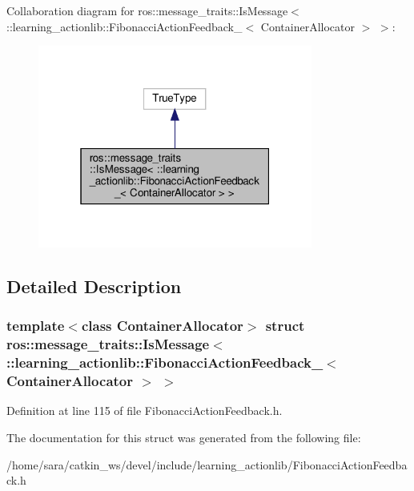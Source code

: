 Collaboration diagram for ros\+:\+:message\+\_\+traits\+:\+:Is\+Message$<$ \+:\+:learning\+\_\+actionlib\+:\+:Fibonacci\+Action\+Feedback\+\_\+$<$ Container\+Allocator $>$ $>$\+:
\nopagebreak
\begin{figure}[H]
\begin{center}
\leavevmode
\includegraphics[width=256pt]{structros_1_1message__traits_1_1IsMessage_3_01_1_1learning__actionlib_1_1FibonacciActionFeedback4bda8b64d4a38d8e0887929c20892fab}
\end{center}
\end{figure}


\subsection{Detailed Description}
\subsubsection*{template$<$class Container\+Allocator$>$\newline
struct ros\+::message\+\_\+traits\+::\+Is\+Message$<$ \+::learning\+\_\+actionlib\+::\+Fibonacci\+Action\+Feedback\+\_\+$<$ Container\+Allocator $>$ $>$}



Definition at line 115 of file Fibonacci\+Action\+Feedback.\+h.



The documentation for this struct was generated from the following file\+:\begin{DoxyCompactItemize}
\item 
/home/sara/catkin\+\_\+ws/devel/include/learning\+\_\+actionlib/Fibonacci\+Action\+Feedback.\+h\end{DoxyCompactItemize}
